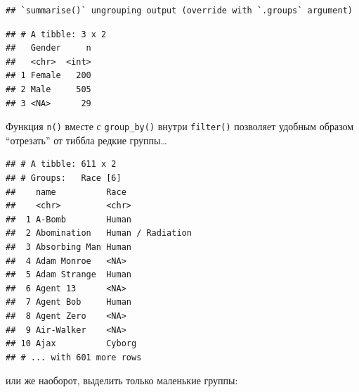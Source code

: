 \documentclass[
]{book}
\newenvironment{Shaded}{\begin{snugshade}}{\end{snugshade}}
\newcommand{\DecValTok}[1]{\textcolor[rgb]{0.00,0.00,0.81}{#1}}
\newcommand{\KeywordTok}[1]{\textcolor[rgb]{0.13,0.29,0.53}{\textbf{#1}}}
\newcommand{\NormalTok}[1]{#1}
\newcommand{\OperatorTok}[1]{\textcolor[rgb]{0.81,0.36,0.00}{\textbf{#1}}}
\newcommand{\StringTok}[1]{\textcolor[rgb]{0.31,0.60,0.02}{#1}}
\begin{document}
\begin{verbatim}
## `summarise()` ungrouping output (override with `.groups` argument)
\end{verbatim}

\begin{verbatim}
## # A tibble: 3 x 2
##   Gender     n
##   <chr>  <int>
## 1 Female   200
## 2 Male     505
## 3 <NA>      29
\end{verbatim}

Функция \texttt{n()} вместе с \texttt{group\_by()} внутри \texttt{filter()} позволяет удобным образом ``отрезать'' от тиббла редкие группы\ldots{}

\begin{Shaded}
\end{Shaded}

\begin{verbatim}
## # A tibble: 611 x 2
## # Groups:   Race [6]
##    name          Race             
##    <chr>         <chr>            
##  1 A-Bomb        Human            
##  2 Abomination   Human / Radiation
##  3 Absorbing Man Human            
##  4 Adam Monroe   <NA>             
##  5 Adam Strange  Human            
##  6 Agent 13      <NA>             
##  7 Agent Bob     Human            
##  8 Agent Zero    <NA>             
##  9 Air-Walker    <NA>             
## 10 Ajax          Cyborg           
## # ... with 601 more rows
\end{verbatim}

или же наоборот, выделить только маленькие группы:

\begin{Shaded}
\end{Shaded}
\end{document}
